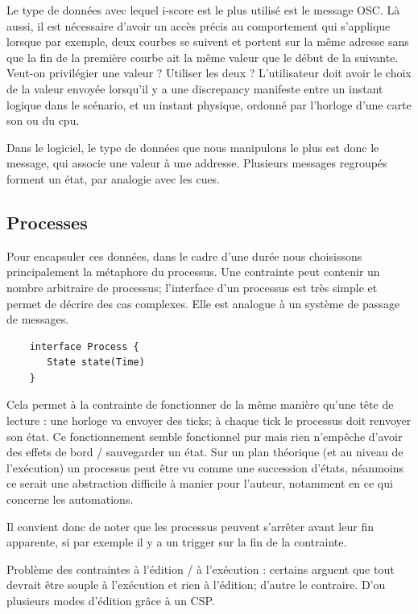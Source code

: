 \documentclass{sigchi}
\begin{document}
Le type de données avec lequel i-score est le plus utilisé est le message OSC. Là aussi, il est nécessaire d'avoir un accès précis au comportement qui s'applique lorsque par exemple, deux courbes se suivent et portent sur la même adresse sans que la fin de la première courbe ait la même valeur que le début de la suivante. Veut-on privilégier une valeur ? Utiliser les deux ? L'utilisateur doit avoir le choix de la valeur envoyée lorsqu'il y a une discrepancy manifeste entre un instant logique dans le scénario, et un instant physique, ordonné par l'horloge d'une carte son ou du cpu.

Dans le logiciel, le type de données que nous manipulons le plus est donc le message, qui associe une valeur à une addresse. Plusieurs messages regroupés forment un état, par analogie avec les cues.

\subsection{Processes}
Pour encapsuler ces données, dans le cadre d'une durée nous choisissons principalement la métaphore du processus. Une contrainte peut contenir un nombre arbitraire de processus; l'interface d'un processus est très simple et permet de décrire des cas complexes. Elle est analogue à un système de passage de messages.

\begin{lstlisting}
    interface Process {
       State state(Time)
    }
\end{lstlisting}

Cela permet à la contrainte de fonctionner de la même manière qu'une tête de lecture : une horloge va envoyer des ticks; à chaque tick le processus doit renvoyer son état. Ce fonctionnement semble fonctionnel pur mais rien n'empêche d'avoir des effets de bord / sauvegarder un état.
Sur un plan théorique (et au niveau de l'exécution) un processus peut être vu comme une succession d'états, néanmoins ce serait une abstraction difficile à manier pour l'auteur, notamment en ce qui concerne les automations.

Il convient donc de noter que les processus peuvent s'arrêter avant leur fin apparente, si par exemple il y a un trigger sur la fin de la contrainte.

Problème des contraintes à l'édition / à l'exécution : certains arguent que tout devrait être souple à l'exécution et rien à l'édition; d'autre le contraire. D'ou plusieurs modes d'édition grâce à un CSP.
\end{document}
